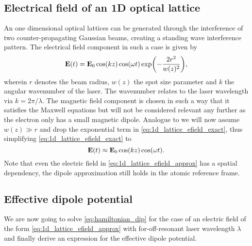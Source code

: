 \subsection{Electrical field of an 1D optical lattice}

An one dimensional optical lattices can be generated through the interference
of two counter-propagating Gaussian beams, creating a standing wave
interference pattern. The electrical field component in such a case is given
by
\begin{equation}
  \vb{E}(t)
  =\vb{E}_0\cos(kz)\cos(\omega t)\exp(-\frac{2r^2}{w(z)^2})
  \label{eq:1d_lattice_efield_exact},
\end{equation}
wherein $r$ denotes the beam radius, $w(z)$ the spot size parameter and $k$
the angular wavenumber of the laser. The wavenumber relates to the laser
wavelength via $k=2\pi/\lambda$. The magnetic field component is chosen
in such a way that it satisfies the Maxwell equations but will not be
considered relevant any further as the electron only has a small magnetic
dipole. Analogue to \cite{Rom2009} we will now assume $w(z)\gg r$ and drop
the exponential term in \cref{eq:1d_lattice_efield_exact}, thus simplifying
\cref{eq:1d_lattice_efield_exact} to
\begin{equation}
  \vb{E}(t)
  \approx\vb{E}_0\cos(kz)\cos(\omega t)
  \label{eq:1d_lattice_efield_approx}.
\end{equation}
Note that even the electric field in \cref{eq:1d_lattice_efield_approx} has
a spatial dependency, the dipole approximation still holds in the atomic
reference frame.

\subsection{Effective dipole potential}

We are now going to solve \cref{eq:hamiltonian_dip} for the case of an
electric field of the form \cref{eq:1d_lattice_efield_approx} with
for-off-resonant laser wavelength $\lambda$ and finally derive an expression
for the effective dipole potential.

